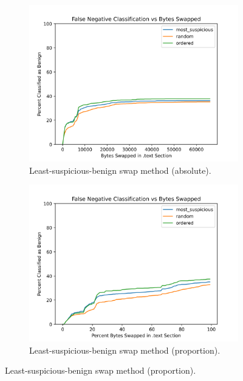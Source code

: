 \documentclass{article}
\begin{document}
\begin{figure}[ht]
\begin{subfigure}{.5\textwidth}
		\centering
		\includegraphics[scale=.5]{./figures/plan/2/least-absolute.png}
		\caption{Least-suspicious-benign swap method (absolute).}
	\end{subfigure}%
	\begin{subfigure}{.5\textwidth}
		\centering
		\includegraphics[scale=.5]{./figures/plan/2/least-proportion.png}
		\caption{Least-suspicious-benign swap method (proportion).}
	\end{subfigure}

\end{figure}
\end{document}
